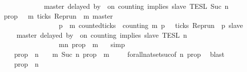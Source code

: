 \begin{isabellebody}
{}\isanewline
\ \ \ \ \ {\isacharparenright}\isanewline
\ \ \ \ \ {\isasyminter}\ {\isasymlbrakk}\ master\ delayed\ by\ {}\ on\ counting\ implies\ slave\ {\isasymrbrakk}\isactrlsub T\isactrlsub E\isactrlsub S\isactrlsub L\isactrlbsup {\isasymge}\ Suc\ n\isactrlesup {\isacartoucheclose}\isanewline
%
\isadelimproof
%
\endisadelimproof
%
\isatagproof
{}\isamarkupfalse%
\ {\isacharminus}\isanewline
\ \ \isamarkupfalse%
\ {\isacharquery}prop\ {\isacharequal}\ {\isacartoucheopen}{\isasymlambda}{\isasymrho}\ m{\isachardot}\ ticks\ {\isacharparenleft}{\isacharparenleft}Rep{\isacharunderscore}run\ {\isasymrho}{\isacharparenright}\ m\ master{\isacharparenright}\ {\isasymlongrightarrow}\isanewline
\ \ \ \ \ \ \ \ \ \ \ \ \ \ \ \ \ {\isacharparenleft}{\isasymforall}p\ {\isasymge}\ m{\isachardot}\ counted{\isacharunderscore}ticks\ {\isasymrho}\ counting\ m\ p\ {}\ {\isasymlongrightarrow}\ ticks\ {\isacharparenleft}{\isacharparenleft}Rep{\isacharunderscore}run\ {\isasymrho}{\isacharparenright}\ p\ slave{\isacharparenright}{\isacharparenright}{\isacartoucheclose}\isanewline
\ \ \isamarkupfalse%
\ {\isacartoucheopen}{\isasymlbrakk}\ master\ delayed\ by\ {}\ on\ counting\ implies\ slave\ {\isasymrbrakk}\isactrlsub T\isactrlsub E\isactrlsub S\isactrlsub L\isactrlbsup {\isasymge}\ n\isactrlesup \ {\isacharequal}\isanewline
\ \ \ \ \ \ \ \ \ \ \ \ \ \ \ \ {\isacharbraceleft}{\isasymrho}{\isachardot}\ {\isasymforall}m{\isasymge}n{\isachardot}\ {\isacharquery}prop\ {\isasymrho}\ m{\isacharbraceright}\ {\isacartoucheclose}\ \isamarkupfalse%
\ simp\isanewline
\ \ \isamarkupfalse%
\ \isamarkupfalse%
\ {\isacartoucheopen}{\isachardot}{\isachardot}{\isachardot}\ {\isacharequal}\ {\isacharbraceleft}{\isasymrho}{\isachardot}\ {\isacharquery}prop\ {\isasymrho}\ n\ {\isacharbraceright}\ {\isasyminter}\ {\isacharbraceleft}{\isasymrho}{\isachardot}\ {\isasymforall}m{\isasymge}\ Suc\ n{\isachardot}\ {\isacharquery}prop\ {\isasymrho}\ m\ {\isacharbraceright}{\isacartoucheclose}\isanewline
\ \ \isamarkupfalse%
\ forall{\isacharunderscore}nat{\isacharunderscore}set{\isacharunderscore}suc{\isacharbrackleft}of\ n\ {\isacartoucheopen}{\isacharquery}prop{\isacartoucheclose}{\isacharbrackright}\ \isamarkupfalse%
\ blast\isanewline
\ \ \isamarkupfalse%
\ \isamarkupfalse%
\ {\isacartoucheopen}{\isachardot}{\isachardot}{\isachardot}\ {\isacharequal}\ {\isacharbraceleft}{\isasymrho}{\isachardot}\ {\isacharquery}prop\ {\isasymrho}\ n{\isacharbraceright}\isanewline

\end{isabellebody}
